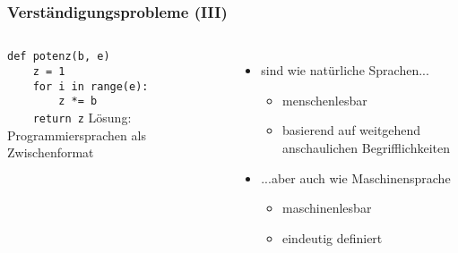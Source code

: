     \begin{frame}
        \frametitle{Verständigungsprobleme (III)}
        \begin{columns}
            \small
            \texttt{def potenz(b, e)}\\
            \texttt{~~~~z = 1} \\
            \texttt{~~~~for i in range(e):} \\
            \texttt{~~~~~~~~z *= b} \\
            \texttt{~~~~return z}
            Lösung: Programmiersprachen als Zwischenformat
            \pause
            \begin{itemize}
                \item sind wie natürliche Sprachen...
                \begin{itemize}
                    \item menschenlesbar
                    \item basierend auf weitgehend anschaulichen Begrifflichkeiten
                \end{itemize}
                \pause
                \item ...aber auch wie Maschinensprache
                \begin{itemize}
                    \item maschinenlesbar
                    \item eindeutig definiert
                \end{itemize}
            \end{itemize}
        \end{columns}
    \end{frame}


